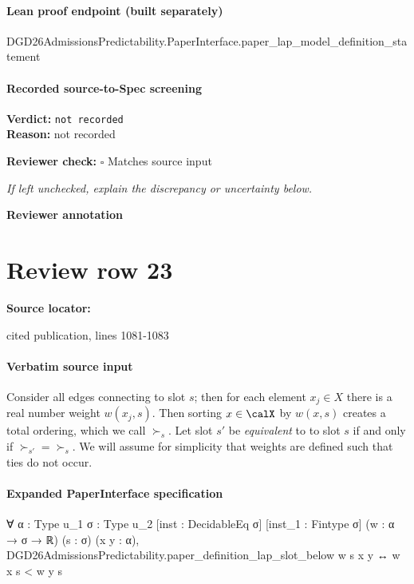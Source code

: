 \documentclass[10pt]{article}
\newcommand{\reviewerbox}{%
  \par\noindent\fbox{\parbox{0.96\linewidth}{\rule{0pt}{0.38in}}}\par
}
\newcommand{\reviewmatch}[1]{%
  \par\noindent\textbf{Reviewer check:} $\square$\; #1\par
  \noindent\emph{If left unchecked, explain the discrepancy or uncertainty below.}\par
}
\begin{document}
\paragraph{Lean proof endpoint (built separately)}\begin{ReviewVerbatim}
DGD26AdmissionsPredictability.PaperInterface.paper_lap_model_definition_statement
\end{ReviewVerbatim}

\paragraph{Recorded source-to-Spec screening}
\textbf{Verdict:} \texttt{not recorded}
\\
\textbf{Reason:} not recorded
\reviewmatch{Matches source input}
\noindent\textbf{Reviewer annotation}\par
\reviewerbox
\clearpage
\hypertarget{source-claim-f902fe2aa64a28cb}{}
\section*{Review row 23}
\textbf{Source locator:} {\footnotesize\raggedright cited publication, lines 1081-\allowbreak{}1083\par}
\paragraph{Verbatim source input}
\begin{ReviewVerbatim}
Consider all edges connecting to slot $s$; then for each element  $x_j \in X$ there is a real number weight $w(x_j, s)$. Then sorting $x \in \calX$ by $w(x,s)$ creates a total ordering, which we call $\succ_s$. Let slot $s'$ be \textit{equivalent} to
to slot $s$ if and only if $\succ_{s'} = \succ_{s}$.
We will assume for simplicity that weights are defined such that ties do not occur.
\end{ReviewVerbatim}


\paragraph{Expanded PaperInterface specification}
\begin{ReviewVerbatim}
∀ {α : Type u_1} {σ : Type u_2} [inst : DecidableEq σ] [inst_1 : Fintype σ] (w : α → σ → ℝ) (s : σ) (x y : α),
  DGD26AdmissionsPredictability.paper_definition_lap_slot_below w s x y ↔ w x s < w y s
\end{ReviewVerbatim}
\end{document}

